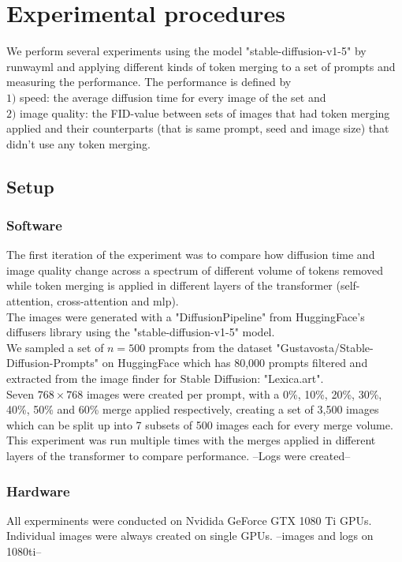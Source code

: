 \section{Experimental procedures}
We perform several experiments using the model "stable-diffusion-v1-5" by runwayml\cite{Rombach_2022_CVPR} and applying different kinds of token merging to a set of prompts and measuring the performance.
The performance is defined by\\ 
\(1)\) speed: the average diffusion time for every image of the set and\\
\(2)\) image quality: the FID-value between sets of images that had token merging applied and their counterparts (that is same prompt, seed and image size) that didn't use any token merging.

\subsection{Setup}
\subsubsection*{Software}
The first iteration of the experiment was to compare how diffusion time and image quality change across a spectrum of different volume of tokens  removed while token merging is applied in different layers of the transformer (self-attention, cross-attention and mlp).\\
The images were generated with a "DiffusionPipeline" from HuggingFace's diffusers library using the "stable-diffusion-v1-5" model\cite{Rombach_2022_CVPR}.\\
We sampled a set of \(n=500\) prompts from the dataset "Gustavosta/Stable-Diffusion-Prompts" on HuggingFace which has 80,000 prompts filtered and extracted from the image finder for Stable Diffusion: "Lexica.art".\\
Seven $768 \times 768$ images were created per prompt, with a 0\%, 10\%, 20\%, 30\%, 40\%, 50\% and 60\% merge applied respectively, creating a set of 3,500 images which can be split up into 7 subsets of 500 images each for every merge volume.\\
This experiment was run multiple times with the merges applied in different layers of the transformer to compare performance.
--Logs were created--

\subsubsection*{Hardware}
All experminents were conducted on Nvidida GeForce GTX 1080 Ti GPUs. Individual images were always created on single GPUs.
--images and logs on 1080ti--

